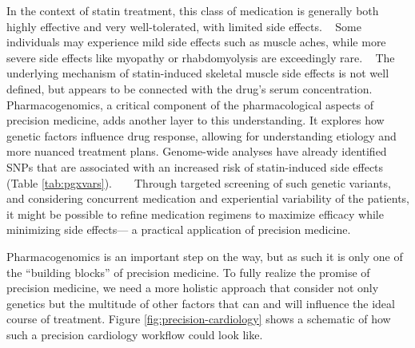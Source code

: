 In the context of statin treatment,
this class of medication is generally both
highly effective and very well-tolerated, with limited side effects.
~\autocite{taylorStatins2013}
Some individuals may experience mild side effects such as muscle aches, 
while more severe side effects like myopathy or rhabdomyolysis 
are exceedingly rare.
~\autocite{thompsonStatinAssociated2003}
The underlying mechanism of 
statin-induced skeletal muscle side effects
is not well defined, 
but appears to be connected with the drug's serum concentration.
~\autocite{thompsonStatinAssociated2003}
Pharmacogenomics, a critical component of the pharmacological aspects of 
precision medicine, 
adds another layer to this understanding. 
It explores how genetic factors influence drug response, 
allowing for understanding etiology and more nuanced treatment plans. 
Genome-wide analyses have already identified \acp{SNP} 
that are associated with an increased risk 
of statin-induced side effects (Table \ref{tab:pgxvars}).
~\autocite{searchcollaborativegroupSLCO1B12008}
~\autocite{thornPharmGKB2013}
Through targeted screening of such genetic variants, 
and considering concurrent medication 
and experiential variability of the patients, 
it might be possible to refine medication regimens 
to maximize efficacy while minimizing side effects---%
a practical application of precision medicine.

Pharmacogenomics is an important step on the way,
but as such it is only one of the \enquote{building blocks} 
of precision medicine.
To fully realize the promise of precision medicine, 
we need a more holistic approach that consider not
only genetics but the multitude of other factors that 
can and will influence the ideal course of treatment.
Figure \ref{fig:precision-cardiology} shows a schematic of 
how such a precision cardiology workflow could look like.

